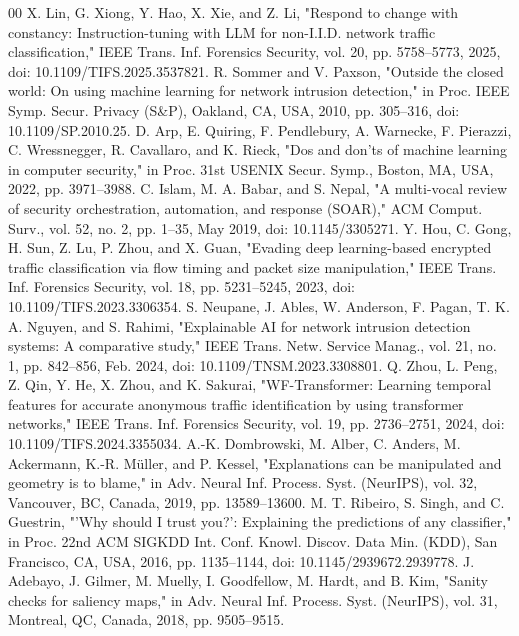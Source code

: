 \documentclass[conference]{IEEEtran}
\begin{document}
\begin{thebibliography}{00}
 X. Lin, G. Xiong, Y. Hao, X. Xie, and Z. Li, "Respond to change with constancy: Instruction-tuning with LLM for non-I.I.D. network traffic classification," IEEE Trans. Inf. Forensics Security, vol. 20, pp. 5758–5773, 2025, doi: 10.1109/TIFS.2025.3537821.
 R. Sommer and V. Paxson, "Outside the closed world: On using machine learning for network intrusion detection," in Proc. IEEE Symp. Secur. Privacy (S\&P), Oakland, CA, USA, 2010, pp. 305–316, doi: 10.1109/SP.2010.25.
 D. Arp, E. Quiring, F. Pendlebury, A. Warnecke, F. Pierazzi, C. Wressnegger, R. Cavallaro, and K. Rieck, "Dos and don'ts of machine learning in computer security," in Proc. 31st USENIX Secur. Symp., Boston, MA, USA, 2022, pp. 3971–3988.
 C. Islam, M. A. Babar, and S. Nepal, "A multi-vocal review of security orchestration, automation, and response (SOAR)," ACM Comput. Surv., vol. 52, no. 2, pp. 1–35, May 2019, doi: 10.1145/3305271.
 Y. Hou, C. Gong, H. Sun, Z. Lu, P. Zhou, and X. Guan, "Evading deep learning-based encrypted traffic classification via flow timing and packet size manipulation," IEEE Trans. Inf. Forensics Security, vol. 18, pp. 5231–5245, 2023, doi: 10.1109/TIFS.2023.3306354.
 S. Neupane, J. Ables, W. Anderson, F. Pagan, T. K. A. Nguyen, and S. Rahimi, "Explainable AI for network intrusion detection systems: A comparative study," IEEE Trans. Netw. Service Manag., vol. 21, no. 1, pp. 842–856, Feb. 2024, doi: 10.1109/TNSM.2023.3308801.
 Q. Zhou, L. Peng, Z. Qin, Y. He, X. Zhou, and K. Sakurai, "WF-Transformer: Learning temporal features for accurate anonymous traffic identification by using transformer networks," IEEE Trans. Inf. Forensics Security, vol. 19, pp. 2736–2751, 2024, doi: 10.1109/TIFS.2024.3355034.
 A.-K. Dombrowski, M. Alber, C. Anders, M. Ackermann, K.-R. Müller, and P. Kessel, "Explanations can be manipulated and geometry is to blame," in Adv. Neural Inf. Process. Syst. (NeurIPS), vol. 32, Vancouver, BC, Canada, 2019, pp. 13589–13600.
 M. T. Ribeiro, S. Singh, and C. Guestrin, "'Why should I trust you?': Explaining the predictions of any classifier," in Proc. 22nd ACM SIGKDD Int. Conf. Knowl. Discov. Data Min. (KDD), San Francisco, CA, USA, 2016, pp. 1135–1144, doi: 10.1145/2939672.2939778.
 J. Adebayo, J. Gilmer, M. Muelly, I. Goodfellow, M. Hardt, and B. Kim, "Sanity checks for saliency maps," in Adv. Neural Inf. Process. Syst. (NeurIPS), vol. 31, Montreal, QC, Canada, 2018, pp. 9505–9515.
\end{thebibliography}
\end{document}
